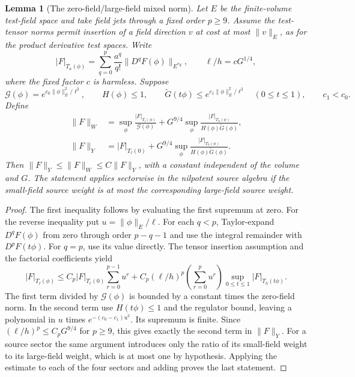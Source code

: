 \documentclass[11pt]{article}
\newtheorem{lemma}[proposition]{Lemma}
\begin{document}
\begin{lemma}[The zero-field/large-field mixed norm]
\label{completion:Y-W}
Let \(E\) be the finite-volume test-field space and take field jets
through a fixed order \(p\ge9\). Assume the test-tensor norms permit
insertion of a field direction \(v\) at cost at most \(\|v\|_E\),
as for the product derivative test spaces. Write
\[
 |F|_{T_a(\phi)}=\sum_{q=0}^p\frac{a^q}{q!}
                    \|D^qF(\phi)\|_{E^{*q}},
 \qquad \ell/h=cG^{1/4},
\]
where the fixed factor \(c\) is harmless. Suppose
\[
 \mathcal G(\phi)=e^{c_0\|\phi\|_E^2/\ell^2},\qquad
 H(\phi)\le1,\qquad
 \widetilde G(t\phi)\le e^{c_1\|\phi\|_E^2/\ell^2}
 \quad(0\le t\le1),\qquad c_1<c_0.
\]
Define
\begin{align*}
 \|F\|_W&=\sup_\phi\frac{|F|_{T_\ell(\phi)}}{\mathcal G(\phi)}
       +G^{9/4}\sup_\phi
              \frac{|F|_{T_h(\phi)}}{H(\phi)\widetilde G(\phi)},\\
 \|F\|_Y&=|F|_{T_\ell(0)}
       +G^{9/4}\sup_\phi
              \frac{|F|_{T_h(\phi)}}{H(\phi)\widetilde G(\phi)}.
\end{align*}
Then \(\|F\|_Y\le\|F\|_W\le C\|F\|_Y\), with a constant independent
of the volume and \(G\). The statement applies sectorwise in the
nilpotent source algebra if the small-field source weight is at most
the corresponding large-field source weight.
\end{lemma}
\begin{proof}
The first inequality follows by evaluating the first supremum at zero.
For the reverse inequality put \(u=\|\phi\|_E/\ell\). For each
\(q<p\), Taylor-expand \(D^qF(\phi)\) from zero through order
\(p-q-1\) and use the integral remainder with \(D^pF(t\phi)\).
For \(q=p\), use its value directly. The tensor insertion assumption
and the factorial coefficients yield
\[
 |F|_{T_\ell(\phi)}
 \le C_p|F|_{T_\ell(0)}\sum_{r=0}^{p-1}u^r
   +C_p(\ell/h)^p\left(\sum_{r=0}^pu^r\right)
                       \sup_{0\le t\le1}|F|_{T_h(t\phi)}.
\]
The first term divided by \(\mathcal G(\phi)\) is bounded by a
constant times the zero-field norm. In the second term use
\(H(t\phi)\le1\) and the regulator bound, leaving a polynomial
in \(u\) times \(e^{-(c_0-c_1)u^2}\). Its supremum is finite.
Since \((\ell/h)^p\le C_pG^{9/4}\) for \(p\ge9\), this gives
exactly the second term in \(\|F\|_Y\).
For a source sector the same argument introduces only the ratio of
its small-field weight to its large-field weight, which is at most
one by hypothesis. Applying the estimate to each of the four sectors
and adding proves the last statement.
\end{proof}
\end{document}
